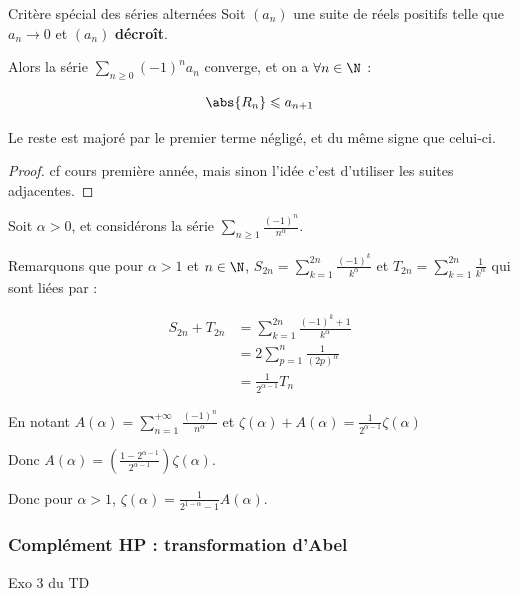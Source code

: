 \begin{theoreme}{Critère spécial des séries alternées}{}
    Soit $(a_n)$ une suite de réels positifs telle que $a_n \longrightarrow 0$ et $(a_n)$ \textbf{décroît}. 

    Alors la série $\sum_{n \geqslant 0} (-1)^n a_n$ converge, et on a $\forall n \in \N$ : 

    $$\abs{R_n} \leqslant a_{n + 1}$$

    Le reste est majoré par le premier terme négligé, et du même signe que celui-ci.
\end{theoreme}

\begin{proof}
    cf cours première année, mais sinon l'idée c'est d'utiliser les suites adjacentes. 
\end{proof}


\begin{exemple}
    Soit $\alpha > 0$, et considérons la série $\sum_{n \geqslant 1} \frac{(-1)^n }{n^\alpha}$.

    Remarquons que pour $\alpha > 1$ et $n \in \N$, $\displaystyle S_{2n} = \sum_{k = 1}^{2n} \frac{(-1)^k}{k^\alpha}$ et 
    $\displaystyle T_{2n} = \sum_{k = 1 }^{2n} \frac{1}{k^\alpha}$ qui sont liées par : 

    \begin{align*}
        S_{2n} + T_{2n} & = \sum_{k = 1}^{2n} \frac{(-1)^k + 1}{k^\alpha} \\
                        & = 2 \sum_{p = 1}^{n} \frac{1}{(2p)^\alpha} \\
                        & = \frac{1}{2^{\alpha - 1}} T_n 
    \end{align*}

    En notant $\displaystyle A(\alpha) = \sum_{n = 1}^{+\infty} \frac{(-1)^n}{n^\alpha}$ et $\displaystyle \zeta(\alpha) + A(\alpha) = \frac{1}{2^{\alpha - 1}} \zeta(\alpha)$

    Donc $A(\alpha) = \left( \frac{1 - 2^{\alpha - 1}}{2^{\alpha - 1}} \right) \zeta(\alpha)$.

    Donc pour $\alpha > 1$, $\displaystyle \zeta(\alpha) = \frac 1 {2^{1 - \alpha} - 1} A(\alpha)$.
\end{exemple}


\subsubsection{Complément HP : transformation d'Abel }


Exo 3 du TD 

